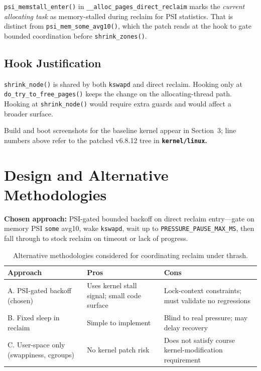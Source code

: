 \documentclass[12pt,a4paper]{article}
\newcommand{\srcfile}[1]{\begingroup\bfseries\color{aublue}\nolinkurl{#1}\endgroup}
\begin{document}
\texttt{psi\_memstall\_enter()} in \texttt{\_\_alloc\_pages\_direct\_reclaim} marks the \emph{current allocating task} as memory-stalled during reclaim for PSI statistics. That is distinct from \texttt{psi\_mem\_some\_avg10()}, which the patch reads at the hook to gate bounded coordination before \texttt{shrink\_zones()}.

\subsection{Hook Justification}

\texttt{shrink\_node()} is shared by both \texttt{kswapd} and direct reclaim. Hooking only at \texttt{do\_try\_to\_free\_pages()} keeps the change on the allocating-thread path. Hooking at \texttt{shrink\_node()} would require extra guards and would affect a broader surface.

Build and boot screenshots for the baseline kernel appear in Section~3; line numbers above refer to the patched v6.8.12 tree in \srcfile{kernel/linux}.

\section{Design and Alternative Methodologies}

\textbf{Chosen approach:} PSI-gated bounded backoff on direct reclaim entry---gate on memory PSI \texttt{some} avg10, wake \texttt{kswapd}, wait up to \texttt{PRESSURE\_PAUSE\_MAX\_MS}, then fall through to stock reclaim on timeout or lack of progress.

\begin{table}[H]
\centering
\begin{tabular}{@{}p{3.5cm}p{5cm}p{5cm}@{}}
\toprule
\textbf{Approach} & \textbf{Pros} & \textbf{Cons} \\
\midrule
A. PSI-gated backoff (chosen) & Uses kernel stall signal; small code surface & Lock-context constraints; must validate no regressions \\
B. Fixed sleep in reclaim & Simple to implement & Blind to real pressure; may delay recovery \\
C. User-space only (swappiness, cgroups) & No kernel patch risk & Does not satisfy course kernel-modification requirement \\
\bottomrule
\end{tabular}
\caption{Alternative methodologies considered for coordinating reclaim under thrash.}
\end{table}
\end{document}
